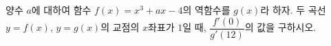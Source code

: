 양수 $a$에 대하여 함수 $f(x)=x^3+ax-4$의 역함수를 $g(x)$라 하자. 두 곡선 $y=f(x)$, $y=g(x)$의 교점의 $x$좌표가 $1$일 때, $\dfrac{f'(0)}{g'(12)}$의 값을 구하시오.
